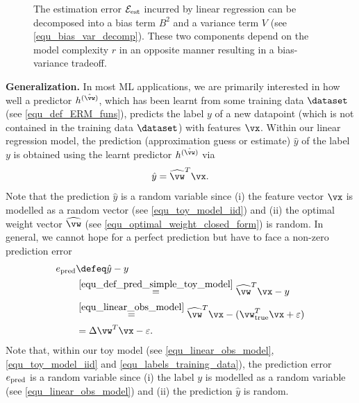 \documentclass[12pt]{report}
\begin{document}
\begin{figure}
\begin{center}
\end{center}
\caption{The estimation error $\mathcal{E}_{\rm est}$ incurred by linear regression can be decomposed 
into a bias term $B^{2}$ and a variance term $V$ (see \eqref{equ_bias_var_decomp}). These two 
components depend on the model complexity $r$ in an opposite manner resulting in a bias-variance 
tradeoff.}
\label{fig_bias_variance}
\end{figure}


{\bf Generalization.}
In most ML applications, we are primarily interested in how well a predictor $h^{(\hat{\vw})}$, which has been 
learnt from some training data $\dataset$ (see \eqref{equ_def_ERM_funs}), predicts the label $y$ of a new 
datapoint (which is not contained in the training data $\dataset$) with features $\vx$. Within our linear regression 
model, the prediction (approximation guess or estimate) $\hat{y}$ of the label $y$ is obtained using the learnt 
predictor $h^{(\hat{\vw})}$ via  
\begin{equation}
\label{equ_def_pred_simple_toy_model}
\hat{y} = \widehat{\vw}^{T} \vx. 
\end{equation} 
Note that the prediction $\hat{y}$ is a random variable since (i) the feature vector $\vx$ is modelled as a 
random vector (see \eqref{equ_toy_model_iid}) and (ii) the optimal weight vector $\widehat{\vw}$ (see \eqref{equ_optimal_weight_closed_form}) 
is random. In general, we cannot hope for a perfect prediction but have to face a non-zero prediction error 
\begin{align}
\label{equ_def_pred_error}
e_{\rm pred} & \defeq \hat{y} - y \nonumber \\ 
& \stackrel{\eqref{equ_def_pred_simple_toy_model}}{=}\widehat{\vw}^{T} \vx - y \nonumber \\ 
& \stackrel{\eqref{equ_linear_obs_model}}{=} \widehat{\vw}^{T} \vx - (\vw_{\rm true}^{T}  \vx + \varepsilon) \nonumber \\ 
& = \Delta \vw^{T}  \vx - \varepsilon.
\end{align} 
Note that, within our toy model (see \eqref{equ_linear_obs_model}, \eqref{equ_toy_model_iid} and \eqref{equ_labels_training_data}), 
the prediction error $e_{\rm pred} $ is a random variable since (i) the label $y$ is modelled as a random 
variable (see \eqref{equ_linear_obs_model}) and (ii) the prediction $\hat{y}$ is random. 
\end{document}
